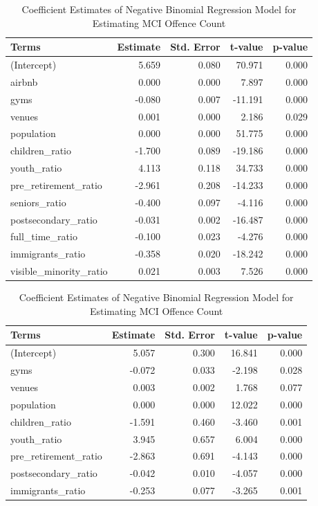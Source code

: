 \documentclass[
]{article}
\begin{document}
\begin{table}
\begin{table}

\caption{\label{tab:poisson-fig}Coefficient Estimates of Poisson Regression Model for Estimating MCI Offence Count}
\centering
\begin{tabular}[t]{l|r|r|r|r}
\hline
Terms & Estimate & Std. Error & t-value & p-value\\
\hline
(Intercept) & 5.659 & 0.080 & 70.971 & 0.000\\
\hline
airbnb & 0.000 & 0.000 & 7.897 & 0.000\\
\hline
gyms & -0.080 & 0.007 & -11.191 & 0.000\\
\hline
venues & 0.001 & 0.000 & 2.186 & 0.029\\
\hline
population & 0.000 & 0.000 & 51.775 & 0.000\\
\hline
children\_ratio & -1.700 & 0.089 & -19.186 & 0.000\\
\hline
youth\_ratio & 4.113 & 0.118 & 34.733 & 0.000\\
\hline
pre\_retirement\_ratio & -2.961 & 0.208 & -14.233 & 0.000\\
\hline
seniors\_ratio & -0.400 & 0.097 & -4.116 & 0.000\\
\hline
postsecondary\_ratio & -0.031 & 0.002 & -16.487 & 0.000\\
\hline
full\_time\_ratio & -0.100 & 0.023 & -4.276 & 0.000\\
\hline
immigrants\_ratio & -0.358 & 0.020 & -18.242 & 0.000\\
\hline
visible\_minority\_ratio & 0.021 & 0.003 & 7.526 & 0.000\\
\hline
\end{tabular}
\end{table}\begin{table}

\caption{\label{tab:nb-fig}Coefficient Estimates of Negative Binomial Regression Model for Estimating MCI Offence Count}
\centering
\begin{tabular}[t]{l|r|r|r|r}
\hline
Terms & Estimate & Std. Error & t-value & p-value\\
\hline
(Intercept) & 5.057 & 0.300 & 16.841 & 0.000\\
\hline
gyms & -0.072 & 0.033 & -2.198 & 0.028\\
\hline
venues & 0.003 & 0.002 & 1.768 & 0.077\\
\hline
population & 0.000 & 0.000 & 12.022 & 0.000\\
\hline
children\_ratio & -1.591 & 0.460 & -3.460 & 0.001\\
\hline
youth\_ratio & 3.945 & 0.657 & 6.004 & 0.000\\
\hline
pre\_retirement\_ratio & -2.863 & 0.691 & -4.143 & 0.000\\
\hline
postsecondary\_ratio & -0.042 & 0.010 & -4.057 & 0.000\\
\hline
immigrants\_ratio & -0.253 & 0.077 & -3.265 & 0.001\\
\hline
\end{tabular}
\end{table}
\end{table}
\end{document}
